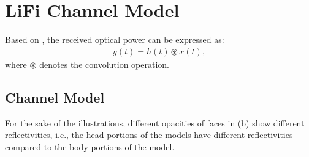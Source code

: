 
    

\section{LiFi Channel Model}
\label{ch:ch_background:channelmodel}
    
    
    
    Based on \cite{kahnkrause,infraredkahn}, the received optical power can be expressed as:
        \begin{align}
            y(t) = h(t) \circledast x(t),
        \end{align}
    where $\circledast$ denotes the convolution operation. 
    


\subsection{Channel Model}
\label{ch:ch_background:owcsimpy}

    
    For the sake of the illustrations, different opacities of faces in (b) show different reflectivities, i.e., the head portions of the models have different reflectivities compared to the body portions of the model.
    

